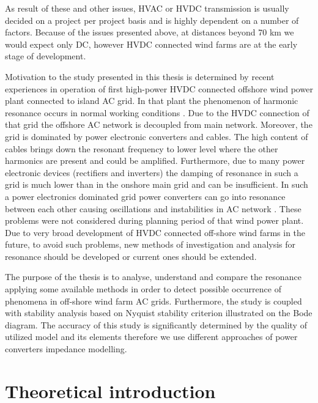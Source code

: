 \documentclass[12pt]{report} %
\begin{document}
As result of these and other issues, HVAC or HVDC transmission is usually decided on a project per project basis and is highly dependent on a number of factors. Because of the issues presented above, at distances beyond 70 km we would expect only DC, however HVDC connected wind farms are at the early stage of development.

Motivation to the study presented in this thesis is determined by recent experiences in operation of first high-power HVDC connected offshore wind power plant connected to island AC grid. In that plant the phenomenon of harmonic resonance occurs in normal working conditions \cite{borwin1}. Due to the HVDC connection of that grid the offshore AC network is decoupled from main network. Moreover, the grid is dominated by power electronic converters and cables. The high content of cables brings down the resonant frequency to lower level where the other harmonics are present and could be amplified. Furthermore, due to many power electronic devices (rectifiers and inverters) the damping of resonance in such a grid is much lower than in the onshore main grid and can be insufficient. In such a power electronics dominated grid power converters can go into resonance between each other causing oscillations and instabilities in AC network \cite{borwin1}. These problems were not considered during planning period of that wind power plant. Due to very broad development of HVDC connected off-shore wind farms in the future, to avoid such problems, new methods of investigation and analysis for resonance should be developed or current ones should be extended.

The purpose of the thesis is to analyse, understand and compare the resonance applying some available methods in order to detect possible occurrence of phenomena in off-shore wind farm AC grids. Furthermore, the study is coupled with stability analysis based on Nyquist stability criterion illustrated on the Bode diagram. The accuracy of this study is significantly determined by the quality of utilized model and its elements therefore we use different approaches of power converters impedance modelling.

\chapter{Theoretical introduction}
\end{document}
